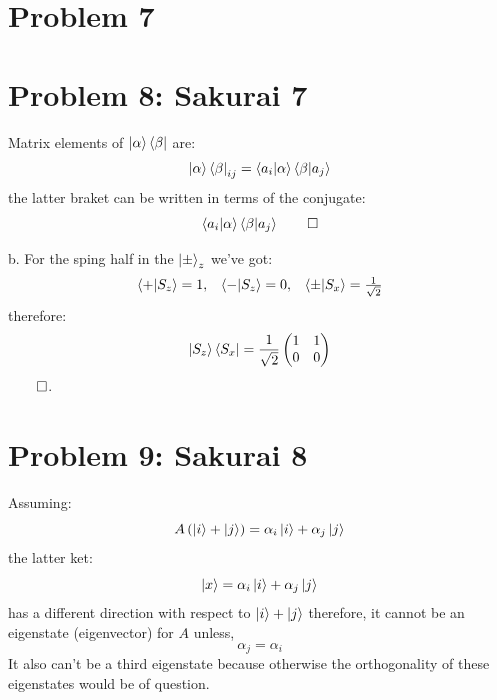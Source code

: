 \documentclass[10pt,twocoloumn]{article}
\begin{document}
\section*{Problem 7}

\section*{Problem   8: Sakurai 7}
Matrix elements of $\left| \alpha \right\rangle \left\langle \beta \right|$ are:
\begin{equation}
    \left| \alpha \right\rangle\left\langle \beta \right|_{ij} = \left\langle a_i \middle| \alpha \right\rangle \left\langle \beta \middle| a_j \right\rangle
\end{equation}
the latter braket can be written in terms of the conjugate:
\begin{equation}
    \left\langle a_i \middle| \alpha \right\rangle\left\langle \beta \middle| a_j \right\rangle\qed
\end{equation}

b. For the sping half in the $\left| \pm \right\rangle_z$ we've got:
\begin{equation}
    \begin{matrix}
        \left\langle + \middle| S_z \right\rangle = 1 , & \left\langle - \middle| S_z \right\rangle=0, & \left\langle \pm \middle| S_x \right\rangle = \frac{1}{\sqrt{2}}
    \end{matrix}
\end{equation}
therefore:
\begin{equation}
    \left| S_z \right\rangle\left\langle S_x \right| = \frac{1}{\sqrt2}\begin{pmatrix}1 & 1 \\ 0 & 0
    \end{pmatrix}
\end{equation}
$\qed$.
\section*{Problem 9: Sakurai 8}
Assuming:
\begin{equation}
    A \left(\left| i \right\rangle +\left| j \right\rangle\right) = \alpha_i \left| i \right\rangle + \alpha_j \left| j \right\rangle
\end{equation}
the latter ket:
\begin{equation}
    \left| x \right\rangle = \alpha_i \left| i \right\rangle + \alpha_j \left| j \right\rangle
\end{equation}
has a different direction with respect to $\left| i \right\rangle + \left| j \right\rangle$ therefore, it cannot be an eigenstate (eigenvector) for $A$ unless,
\begin{equation}
    \alpha_j = \alpha_i
\end{equation}
It also can't be a third eigenstate because otherwise the orthogonality of these eigenstates would be of question.
\end{document}
